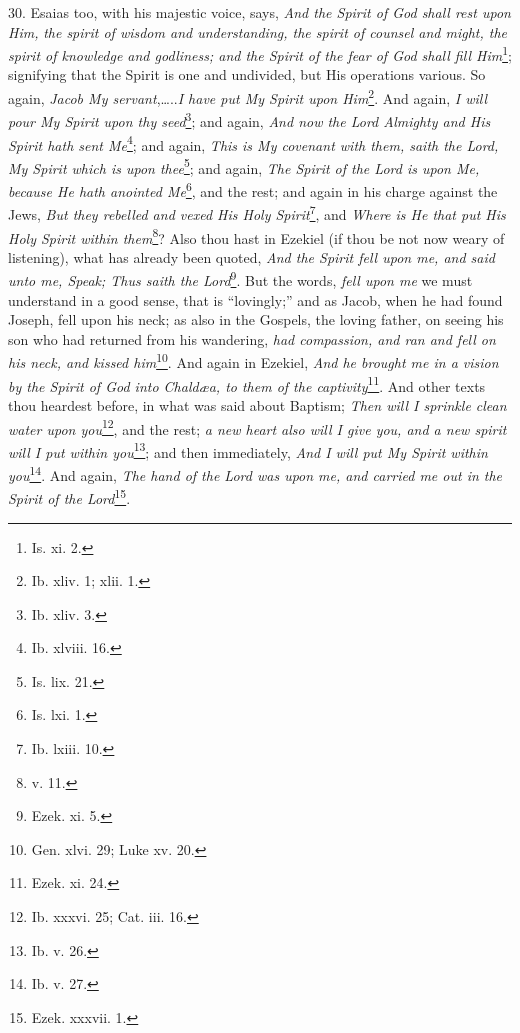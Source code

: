 30. Esaias too, with his majestic voice, says, \emph{And the Spirit of God shall rest upon Him,} \emph{the spirit of wisdom and understanding, the spirit of counsel and might, the spirit of knowledge and godliness; and the Spirit of the fear of God shall fill Him}\footnote{Is. xi. 2.}; signifying that the Spirit is one and undivided, but His operations various. So again, \emph{Jacob My servant},…..\emph{I have put My Spirit upon Him}\footnote{Ib. xliv. 1; xlii. 1.}. And again, \emph{I will pour My Spirit upon thy seed}\footnote{Ib. xliv. 3.}; and again, \emph{And now the Lord Almighty and His Spirit hath sent Me}\footnote{Ib. xlviii. 16.}; and again, \emph{This is My covenant with them, saith the Lord, My Spirit which is upon thee}\footnote{Is. lix. 21.}; and again, \emph{The Spirit of the Lord is upon Me, because He hath anointed Me}\footnote{Is. lxi. 1.}, and the rest; and again in his charge against the Jews, \emph{But they rebelled and vexed His Holy Spirit}\footnote{Ib. lxiii. 10.}, and \emph{Where is He that put His Holy Spirit within them}\footnote{v. 11.}? Also thou hast in Ezekiel (if thou be not now weary of listening), what has already been quoted, \emph{And the Spirit fell upon me, and said unto me, Speak; Thus saith the Lord}\footnote{Ezek. xi. 5.}. But the words, \emph{fell upon me} we must understand in a good sense, that is “lovingly;” and as Jacob, when he had found Joseph, fell upon his neck; as also in the Gospels, the loving father, on seeing his son who had returned from his wandering, \emph{had compassion, and ran and fell on his neck, and kissed him}\footnote{Gen. xlvi. 29; Luke xv. 20.}. And again in Ezekiel, \emph{And he brought me in a vision by the Spirit of God into Chaldæa, to them of the captivity}\footnote{Ezek. xi. 24.}. And other texts thou heardest before, in what was said about Baptism; \emph{Then will I sprinkle clean water upon you}\footnote{Ib. xxxvi. 25; Cat. iii. 16.}, and the rest; \emph{a new heart also will I give you, and a new spirit will I put within you}\footnote{Ib. v. 26.}; and then immediately, \emph{And I will put My Spirit within you}\footnote{Ib. v. 27.}. And again, \emph{The hand of the Lord was upon me, and carried me out in the Spirit of the Lord}\footnote{Ezek. xxxvii. 1.}.

